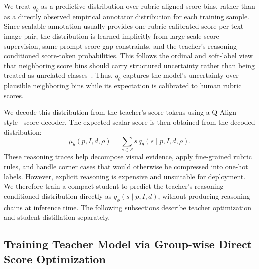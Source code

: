 \documentclass{article}
\begin{document}
We treat $q_\theta$ as a predictive distribution over rubric-aligned score bins, rather than as a directly observed empirical annotator distribution for each training sample. Since scalable annotation usually provides one rubric-calibrated score per text--image pair, the distribution is learned implicitly from large-scale score supervision, same-prompt score-gap constraints, and the teacher's reasoning-conditioned score-token probabilities. This follows the ordinal and soft-label view that neighboring score bins should carry structured uncertainty rather than being treated as unrelated classes~\cite{diaz2019soft,wen2023ordinal}. Thus, $q_\theta$ captures the model's uncertainty over plausible neighboring bins while its expectation is calibrated to human rubric scores.


We decode this distribution from the teacher's score tokens using a Q-Align-style~\cite{wu2023qalign} score decoder. The expected scalar score is then obtained from the decoded distribution:
\begin{equation}
\mu_\theta(p,I,d,\rho) = \sum_{s \in \mathcal{S}} s \, q_\theta(s \mid p,I,d,\rho).
\label{eq:method-expected-score}
\end{equation}
These reasoning traces help decompose visual evidence, apply fine-grained rubric rules, and handle corner cases that would otherwise be compressed into one-hot labels. However, explicit reasoning is expensive and unsuitable for deployment. We therefore train a compact student to predict the teacher's reasoning-conditioned distribution directly as $q_\phi(s \mid p,I,d)$, without producing reasoning chains at inference time. The following subsections describe teacher optimization and student distillation separately.

\subsection{Training Teacher Model via Group-wise Direct Score Optimization}
\end{document}
